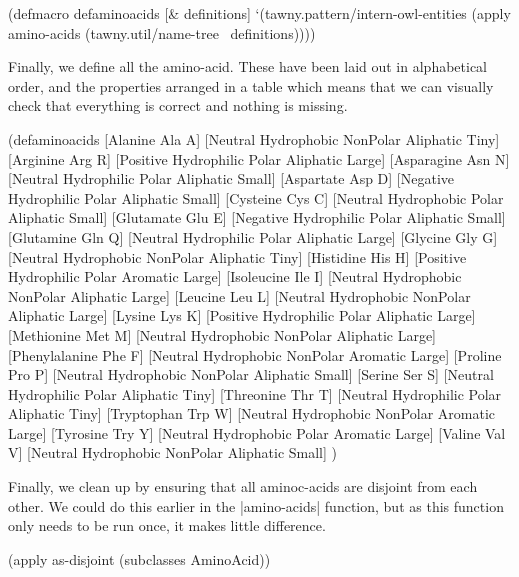 \begin{tawny}
(defmacro defaminoacids
  [& definitions]
  `(tawny.pattern/intern-owl-entities
    (apply amino-acids
           (tawny.util/name-tree ~definitions))))
\end{tawny}

Finally, we define all the amino-acid. These have been laid out in
alphabetical order, and the properties arranged in a table which means that we
can visually check that everything is correct and nothing is missing.

\begin{tawny}
(defaminoacids
  [Alanine       Ala A] [Neutral  Hydrophobic NonPolar Aliphatic Tiny]
  [Arginine      Arg R] [Positive Hydrophilic Polar    Aliphatic Large]
  [Asparagine    Asn N] [Neutral  Hydrophilic Polar    Aliphatic Small]
  [Aspartate     Asp D] [Negative Hydrophilic Polar    Aliphatic Small]
  [Cysteine      Cys C] [Neutral  Hydrophobic Polar    Aliphatic Small]
  [Glutamate     Glu E] [Negative Hydrophilic Polar    Aliphatic Small]
  [Glutamine     Gln Q] [Neutral  Hydrophilic Polar    Aliphatic Large]
  [Glycine       Gly G] [Neutral  Hydrophobic NonPolar Aliphatic Tiny]
  [Histidine     His H] [Positive Hydrophilic Polar    Aromatic  Large]
  [Isoleucine    Ile I] [Neutral  Hydrophobic NonPolar Aliphatic Large]
  [Leucine       Leu L] [Neutral  Hydrophobic NonPolar Aliphatic Large]
  [Lysine        Lys K] [Positive Hydrophilic Polar    Aliphatic Large]
  [Methionine    Met M] [Neutral  Hydrophobic NonPolar Aliphatic Large]
  [Phenylalanine Phe F] [Neutral  Hydrophobic NonPolar Aromatic  Large]
  [Proline       Pro P] [Neutral  Hydrophobic NonPolar Aliphatic Small]
  [Serine        Ser S] [Neutral  Hydrophilic Polar    Aliphatic Tiny]
  [Threonine     Thr T] [Neutral  Hydrophilic Polar    Aliphatic Tiny]
  [Tryptophan    Trp W] [Neutral  Hydrophobic NonPolar Aromatic  Large]
  [Tyrosine      Try Y] [Neutral  Hydrophobic Polar    Aromatic  Large]
  [Valine        Val V] [Neutral  Hydrophobic NonPolar Aliphatic Small]
  )
\end{tawny}

Finally, we clean up by ensuring that all aminoc-acids are disjoint from each
other. We could do this earlier in the |amino-acids| function, but as this
function only needs to be run once, it makes little difference.

\begin{tawny}
(apply as-disjoint (subclasses AminoAcid))
\end{tawny}

